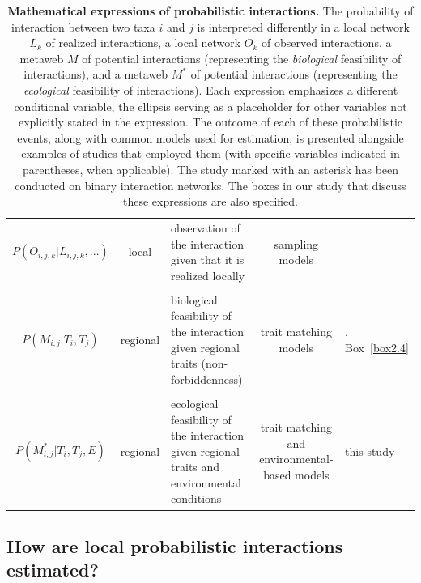 \begin{table}[h!]
{\begin{tabular}{c c p{5cm} c p{6cm}}
  \\
  $P(O_{i, j, k} \vert L_{i, j, k},...)$ & local & observation of the interaction given that it is realized locally & sampling models & \textcite{Catchen2023Missinga} \\
  \\
  $P(M_{i, j} \vert T_i, T_j)$ & regional & biological feasibility of the interaction given regional traits (non-forbiddenness) & trait matching models & \textcite{Strydom2022Food}, Box~\ref{box2.4} \\
  \\
  $P(M^*_{i, j} \vert T_i, T_j, E)$ & regional & ecological feasibility of the interaction given regional traits and environmental conditions & \makecell{trait matching and \\ environmental-based models} & this study \\
  \hline
  \end{tabular}
  }
  \caption{\textbf{Mathematical expressions of probabilistic interactions.} The
  probability of interaction between two taxa $i$ and $j$ is interpreted
  differently in a local network $L_k$ of realized interactions, a local network
  $O_k$ of observed interactions, a metaweb $M$ of potential interactions
  (representing the \textit{biological} feasibility of interactions), and a metaweb $M^*$
  of potential interactions (representing the \textit{ecological} feasibility of
  interactions). Each expression emphasizes a different conditional variable, the
  ellipsis serving as a placeholder for other variables not explicitly stated in
  the expression. The outcome of each of these probabilistic events, along with
  common models used for estimation, is presented alongside examples of studies
  that employed them (with specific variables indicated in parentheses, when
  applicable). The study marked with an asterisk has been conducted on binary
  interaction networks. The boxes in our study that discuss these expressions are
  also specified.}
  \label{tbl:prob}
\end{table}

\clearpage

\subsection{How are local probabilistic interactions estimated?}

